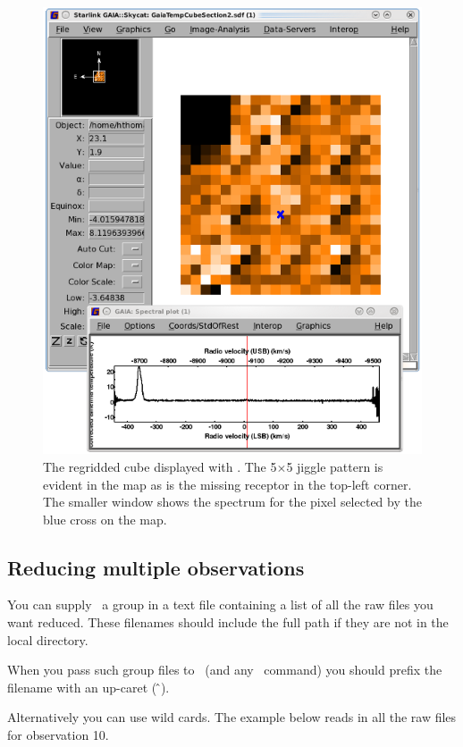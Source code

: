 \documentclass[11pt,oneside,chapters]{starlink}
\begin{document}
\begin{figure}[t!]
\begin{center}
\includegraphics[width=0.65\linewidth]{sc20_makecubeout}
\caption[A regridded cube produced with \makecube.]{\label{fig:gaiareduced}
  The regridded cube displayed with \gaia. The 5$\times$5 jiggle
  pattern is evident in the map as is the missing receptor in the
  top-left corner. The smaller window shows the spectrum for the pixel
  selected by the blue cross on the map.}
\end{center}
\end{figure}

\subsection{Reducing multiple observations}

You can supply \makecube\ a group in a text file containing a list of
all the raw files you want reduced. These filenames should include the
full path if they are not in the local directory.

When you pass such group files to \makecube\ (and any \starlink\ command)
you should prefix the filename with an up-caret (\,\^\,).
\begin{terminalv}
\end{terminalv}

Alternatively you can use wild cards. The example below reads in all
the raw files for observation 10.
\begin{terminalv}
\end{terminalv}
\end{document}
